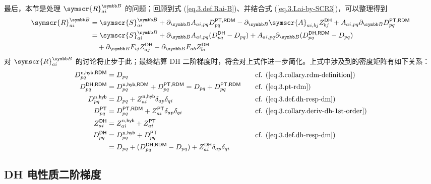 最后，本节是处理 $\symscr{R}_{ai}^\mathbb{B}$ 的问题；回顾到式 (\ref{eq.3.def.Rai-B})、并结合式 (\ref{eq.3.Lai-by-SCR3})，可以整理得到
\begin{align}
    \label{eq.3.program-scrR}
    \symscr{R}_{ai}^\mathbb{B} &= \symscr{S}_{ai}^{\mathbb{B}} + \partial_\mathbb{B} A_{ai, pq} D_{pq}^{\textmt{PT}, \textmt{RDM}} - \partial_\mathbb{B} \symscr{A}_{ai, bj} Z_{bj}^\textmt{DH} + A_{ai, pq} \partial_\mathbb{B} D_{pq}^{\textmt{PT}, \textmt{RDM}} \notag\\
    &= \symscr{S}_{ai}^{\mathbb{B}} + \partial_\mathbb{B} A_{ai, pq} (D_{pq}^{\textmt{DH}} - D_{pq}) + A_{ai, pq} \partial_\mathbb{B} (D_{pq}^{\textmt{DH}, \textmt{RDM}} - D_{pq}) \notag\\
    &\quad+ \partial_\mathbb{B} F_{ij} Z_{aj}^\textmt{DH} - \partial_\mathbb{B} F_{ab} Z_{bi}^\textmt{DH}
\end{align}
对 $\symscr{R}_{ai}^\mathbb{B}$ 的讨论将止步于此；最终结算 DH 二阶梯度时，将会对上式作进一步简化。上式中涉及到的密度矩阵有如下关系：
\begin{alignat*}{10}
    D_{pq}^{\mathrm{n}, \textmt{hyb}, \textmt{RDM}} &= D_{pq}
    &\quad& \text{cf. (\ref{eq.3.collary.rdm-definition})} \\
    D_{pq}^{\textmt{DH}, \textmt{RDM}} &= D_{pq}^{\mathrm{n}, \textmt{hyb}, \textmt{RDM}} + D_{pq}^{\textmt{PT}, \textmt{RDM}} = D_{pq} + D_{pq}^{\textmt{PT}, \textmt{RDM}}
    &\quad& \text{cf. (\ref{eq.3.pt-rdm})} \\
    D_{pq}^{\mathrm{n}, \textmt{hyb}} &= D_{pq} + Z_{ai}^{\mathrm{n}, \textmt{hyb}} \delta_{ap} \delta_{qi}
    &\quad& \text{cf. (\ref{eq.3.def.dh-resp-dm})} \\
    D_{pq}^{\textmt{PT}} &= D_{pq}^{\textmt{PT}, \textmt{RDM}} + Z_{ai}^{\textmt{PT}} \delta_{ap} \delta_{qi}
    &\quad& \text{cf. (\ref{eq.3.collary.deriv-dh-1st-order})} \\
    Z_{ai}^\textmt{DH} &= Z_{ai}^{\mathrm{n}, \textmt{hyb}} + Z_{ai}^{\textmt{PT}} \\
    D_{pq}^\textmt{DH} &= D_{pq}^{\mathrm{n}, \textmt{hyb}} + D_{pq}^{\textmt{PT}}
    &\quad& \text{cf. (\ref{eq.3.def.dh-resp-dm})} \\
    &= D_{pq} + (D_{pq}^{\textmt{DH}, \textmt{RDM}} - D_{pq}) + Z_{ai}^\textmt{DH} \delta_{ap} \delta_{qi}
\end{alignat*}

\subsection{DH 电性质二阶梯度}

